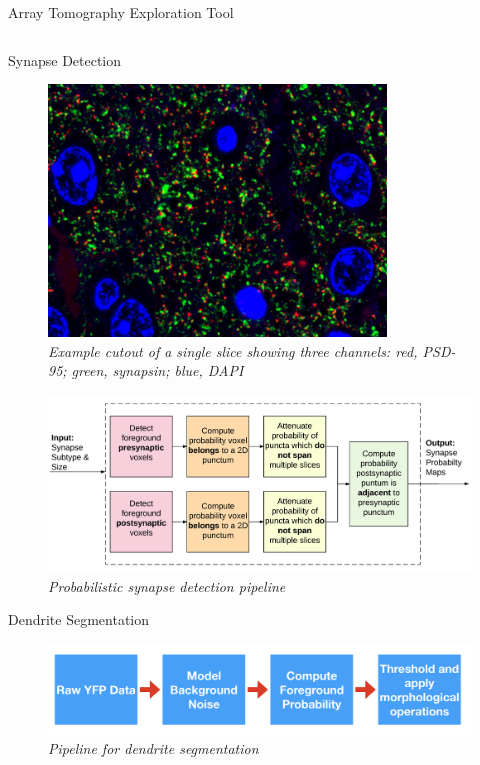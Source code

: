 \documentclass[final, table]{beamer}
\newlength{\onecolwid}
\newlength{\twocolwid}
\begin{document}
\begin{frame}[t]
\begin{columns}[t]
\begin{column}{\twocolwid}
\begin{block}{Array Tomography Exploration Tool}
\end{block}


\begin{columns}[t]  %

\begin{column}{\onecolwid}


\begin{block}{Synapse Detection}
\begin{figure}
\centering
\includegraphics[width=0.8\textwidth]{figs/threechannelcutout}
\caption{\textit{Example cutout of a single slice showing three channels: red, PSD-95; green, synapsin; blue, DAPI}}
\end{figure}

\begin{figure}
\centering
\includegraphics[width=1\textwidth]{figs/pipeline2}
\caption{\textit{Probabilistic synapse detection pipeline}}
\end{figure}

\end{block}

 
\begin{block}{Dendrite Segmentation} 

\begin{figure}
\centering
\includegraphics[width=1\textwidth]{figs/dendrite_pipeline}
\caption{\textit{Pipeline for dendrite segmentation}}
\end{figure}


\end{block}
\end{column}
\end{columns}
\end{column}
\end{columns}
\end{frame}
\end{document}
